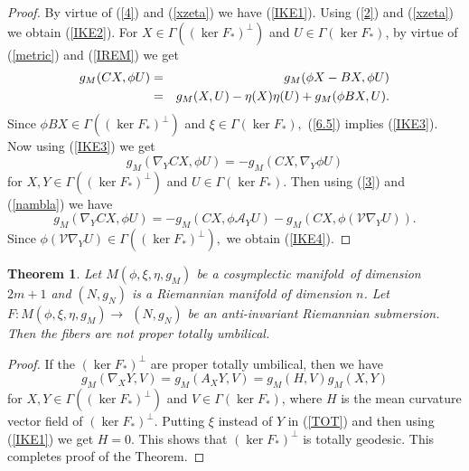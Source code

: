\documentclass{amsart}
\newtheorem{theorem}{Theorem}
\theoremstyle{plain}
\numberwithin{equation}{section}
\begin{document}
\begin{proof}
By virtue of (\ref{4}) and (\ref{xzeta}) we have (\ref{IKE1}). Using (\ref{2}) and (\ref{xzeta}) we obtain (\ref{IKE2}). For $X\in \Gamma ((\ker F_{\ast
})^{\bot })$ and $U\in \Gamma (\ker F_{\ast })$, by virtue of (\ref{metric})
and (\ref{IREM}) we get 
\begin{eqnarray}
g_{M}(CX,\phi U) &=&g_{M}(\phi X-BX,\phi U)  \label{6.5} \\
&=&g_{M}(X,U)-\eta (X)\eta (U)+g_{M}(\phi BX,U).  \notag
\end{eqnarray}Since $\phi BX\in \Gamma ((\ker F_{\ast })^{\bot })$ and $\xi \in \Gamma
(\ker F_{\ast }),$ (\ref{6.5}) implies (\ref{IKE3}). Now using (\ref{IKE3})
we get\begin{equation*}
g_{M}(\nabla _{Y}CX,\phi U)=-g_{M}(CX,\nabla _{Y}\phi U)
\end{equation*}for $X,Y\in \Gamma ((\ker F_{\ast })^{\bot })$ and $U\in \Gamma (\ker
F_{\ast })$. Then using (\ref{3}) and (\ref{nambla}) we have 
\begin{equation*}
g_{M}(\nabla _{Y}CX,\phi U)=-g_{M}(CX,\phi \mathcal{A}_{Y}U)-g_{M}(CX,\phi (\mathcal{V}\nabla _{Y}U)).
\end{equation*}Since $\phi (\mathcal{V}\nabla _{Y}U)\in \Gamma ((\ker F_{\ast })^{\bot }),$
we obtain (\ref{IKE4}).
\end{proof}

\begin{theorem}
Let $M(\phi ,\xi ,\eta ,g_{M})$ be a cosymplectic manifold\ of dimension $2m+1$ and $(N,g_{N})$ is a Riemannian manifold of dimension $n$. Let $F:M(\phi ,\xi ,\eta ,g_{M})\rightarrow $ $(N,g_{N})$ be an anti-invariant
Riemannian submersion. Then the fibers are not proper totally umbilical.
\end{theorem}

\begin{proof}
If the $(\ker F_{\ast })^{\bot }$ are proper totally umbilical, then we have 
\begin{equation}
g_{M}(\nabla _{X}Y,V)=g_{M}(A_{X}Y,V)=g_{M}(H,V)g_{M}(X,Y)  \label{TOT}
\end{equation}for $X,Y\in \Gamma ((\ker F_{\ast })^{\bot })$ and $V\in \Gamma (\ker
F_{\ast })$, where $H$ is the mean curvature vector field of $(\ker F_{\ast
})^{\bot }$. Putting $\xi $ instead of $Y$ in (\ref{TOT}) and then using (\ref{IKE1}) we get $H=0$. This shows that $(\ker F_{\ast })^{\bot }$ is
totally geodesic. This completes proof of the Theorem.
\end{proof}
\end{document}

